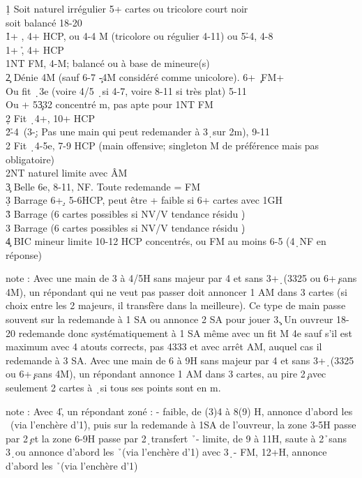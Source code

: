 \documentclass[a4paper]{article}
\begin{document}
\begin{bidtable}
1\d \> Soit naturel irrégulier 5+ cartes ou tricolore court noir\+\\
soit \> balancé 18-20\\
1\h {}+ \s , 4+ HCP, ou 4-4 M (tricolore ou régulier 4-11) ou 5\h -4\s , 4-8\\
1\s {}+ \h , 4+ HCP\\
1NT \> FM, 4-M; balancé ou à base de mineure(s)\\
2\c \> Dénie 4M (sauf 6-7 \c -4M considéré comme unicolore). 6+ \c\ FM+\+\\
Ou \> fit \d\ 3e (voire 4/5 \d\ si 4-7, voire 8-11 si très plat) 5-11\\
Ou + 5\c 332 concentré m, pas apte pour 1NT FM\-\\
2\d \> Fit \d\ 4+, 10+ HCP\\
2\h {}\h -4\s\ (3-\d ; Pas une main qui peut redemander à 3\d\ sur 2m), 9-11\\
2\s \> Fit \d\ 4-5e, 7-9 HCP (main offensive; singleton M de préférence mais pas obligatoire)\\
2NT \> naturel limite avec ÂM\\
3\c \> Belle 6e, 8-11, NF. Toute redemande = FM\\
3\d \> Barrage 6+\d , 5-6HCP, peut être + faible si 6+ cartes avec 1GH\\
3\h \> Barrage (6 cartes possibles si NV/V tendance résidu \d )\\
3\s \> Barrage (6 cartes possibles si NV/V tendance résidu \d )\\
4\c \> BIC mineur limite 10-12 HCP concentrés, ou FM au moins 6-5 (4\d\ NF en réponse)\-
\end{bidtable}

note : 	Avec une main de 3 à 4/5H sans majeur par 4 et sans 3+\d\ (3325 ou 6+\c\ sans 4M),
un répondant qui ne veut pas passer doit annoncer 1 AM dans 3 cartes (si choix entre les 2 majeurs, il transfère dans la meilleure).
Ce type de main passe souvent sur la redemande à 1 SA ou annonce 2 SA pour jouer 3\c .
Un ouvreur 18-20 redemande donc systématiquement à 1 SA même avec un fit M 4e sauf s’il est maximum avec 4 atouts corrects, pas 4333 et avec arrêt AM, auquel cas il redemande à 3 SA.
Avec une main de 6 à 9H sans majeur par 4 et sans 3+\d\ (3325 ou 6+\c\ sans 4M), un répondant annonce 1 AM dans 3 cartes, au pire 2\c\ avec seulement 2 cartes à \d\ si tous ses points sont en m.

note : 	Avec 4\h , un répondant zoné :
-	faible, de (3)4 à 8(9) H, annonce d'abord les \s\ (via l'enchère d'1\h ), puis sur la redemande à 1SA de l’ouvreur, la zone 3-5H passe par 2\c\ et la zone 6-9H passe par 2\d\ transfert \h\ 
-	limite, de 9 à 11H, saute à 2\h{}ans 3\d\ ou annonce d'abord les \h\ (via l'enchère d'1\s ) avec 3\d\ 
-	FM, 12+H, annonce d'abord les \h\ (via l'enchère d'1\s )
\end{document}
